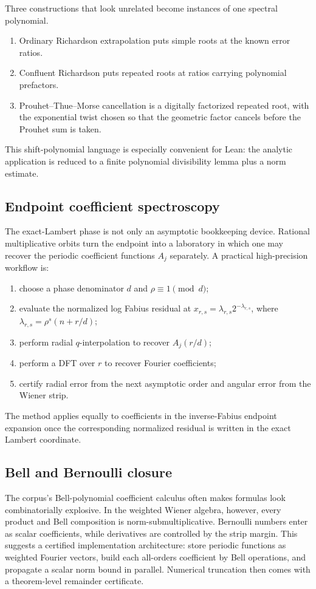 \documentclass[11pt,oneside]{article}
\numberwithin{equation}{section}
\theoremstyle{definition}
\theoremstyle{remark}
\begin{document}
Three constructions that look unrelated become instances of one spectral polynomial.
\begin{enumerate}
\item Ordinary Richardson extrapolation puts simple roots at the known error ratios.
\item Confluent Richardson puts repeated roots at ratios carrying polynomial prefactors.
\item Prouhet--Thue--Morse cancellation is a digitally factorized repeated root, with the
      exponential twist chosen so that the geometric factor cancels before the Prouhet sum
      is taken.
\end{enumerate}
This shift-polynomial language is especially convenient for Lean: the analytic application
is reduced to a finite polynomial divisibility lemma plus a norm estimate.

\subsection{Endpoint coefficient spectroscopy}

The exact-Lambert phase is not only an asymptotic bookkeeping device.  Rational
multiplicative orbits turn the endpoint into a laboratory in which one may recover the
periodic coefficient functions $A_j$ separately.  A practical high-precision workflow is:
\begin{enumerate}
\item choose a phase denominator $d$ and $\rho\equiv1\pmod d$;
\item evaluate the normalized log Fabius residual at
$x_{r,s}=\lambda_{r,s}2^{-\lambda_{r,s}}$, where
$\lambda_{r,s}=\rho^s(n+r/d)$;
\item perform radial $q$-interpolation to recover $A_j(r/d)$;
\item perform a DFT over $r$ to recover Fourier coefficients;
\item certify radial error from the next asymptotic order and angular error from the
      Wiener strip.
\end{enumerate}
The method applies equally to coefficients in the inverse-Fabius endpoint expansion once
the corresponding normalized residual is written in the exact Lambert coordinate.

\subsection{Bell and Bernoulli closure}

The corpus's Bell-polynomial coefficient calculus often makes formulas look combinatorially
explosive.  In the weighted Wiener algebra, however, every product and Bell composition is
norm-submultiplicative.  Bernoulli numbers enter as scalar coefficients, while derivatives
are controlled by the strip margin.  This suggests a certified implementation architecture:
store periodic functions as weighted Fourier vectors, build each all-orders coefficient by
Bell operations, and propagate a scalar norm bound in parallel.  Numerical truncation then
comes with a theorem-level remainder certificate.
\end{document}

